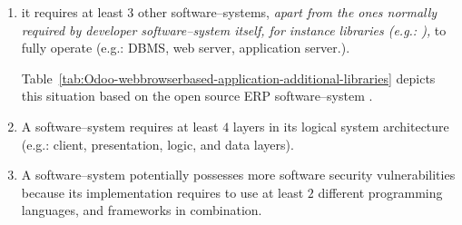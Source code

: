 \begin{enumerate}[1.]
	\item it requires at least $3$ other 
		software--systems, \emph{apart from
		the ones normally required by developer
		software--system itself, for instance libraries (e.g.:
		\logFourJ),} to fully operate
		(e.g.: DBMS, web server, application server.).
		
		Table~\ref{tab:Odoo-webbrowserbased-application-additional-libraries}
		depicts this situation based on the open source ERP
		software--system \Odoo.		
				
	\item A \webbrowserbased software--system
		requires at least $4$ layers in
		its logical system architecture
		(e.g.: client, presentation, logic,
		and data layers).

	\item A \webbrowserbased software--system
		potentially possesses more software
		security vulnerabilities because its
		implementation requires to use at least
		$2$ different programming languages, and
		frameworks in combination.
\end{enumerate}

